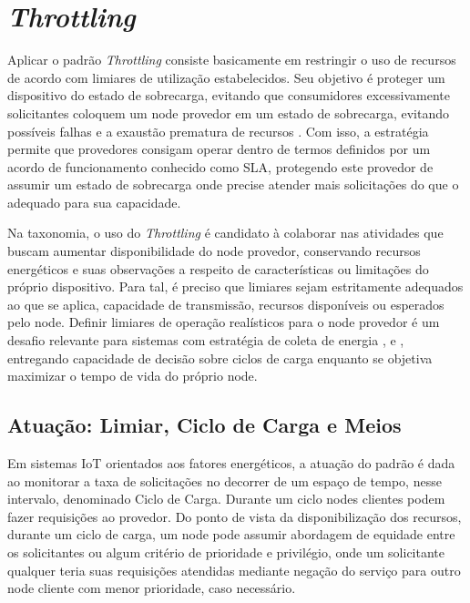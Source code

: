 \section{\textit{Throttling}}

Aplicar o padrão \textit{Throttling} consiste basicamente em restringir o uso de recursos de acordo com limiares de utilização estabelecidos. Seu objetivo é proteger um dispositivo do estado de sobrecarga, evitando que consumidores excessivamente solicitantes coloquem um node provedor em um estado de sobrecarga, evitando possíveis falhas e a exaustão prematura de recursos \cite{martinekuan_throttling_nodate}. Com isso, a estratégia permite que provedores consigam operar dentro de termos definidos por um acordo de funcionamento conhecido como \acf{SLA}, protegendo este provedor de assumir um estado de sobrecarga onde precise atender mais solicitações do que o adequado para sua capacidade.

Na taxonomia, o uso do \textit{Throttling} é candidato à colaborar nas atividades que buscam aumentar disponibilidade do node provedor, conservando  recursos energéticos e suas observações a respeito de características ou limitações do próprio dispositivo. Para tal, é preciso que limiares sejam estritamente adequados ao que se aplica, capacidade de transmissão, recursos disponíveis ou esperados pelo node. Definir limiares de operação realísticos para o node provedor é um desafio relevante para sistemas com estratégia de coleta de energia \cite{khairnar_discrete-rate_2015}, \cite{liu_energy_2016} e \cite{zhang_toward_2018}, entregando capacidade de decisão sobre ciclos de carga enquanto se objetiva maximizar o tempo de vida do próprio node.

\subsection{Atuação: Limiar, Ciclo de Carga e Meios}
Em sistemas \acs{IoT} orientados aos fatores energéticos, a atuação do padrão é dada ao monitorar a taxa de solicitações no decorrer de um espaço de tempo, nesse intervalo, denominado Ciclo de Carga. Durante um ciclo nodes clientes podem fazer requisições ao provedor. Do ponto de vista da disponibilização dos recursos, durante um ciclo de carga, um node pode assumir abordagem de equidade entre os solicitantes ou algum critério de prioridade e privilégio, onde um solicitante qualquer teria suas requisições atendidas mediante negação do serviço para outro node cliente com menor prioridade, caso necessário.

